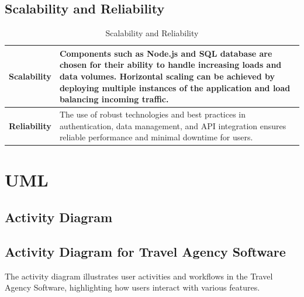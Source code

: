 \documentclass{scrreprt}
\begin{document}
    
    \begin{table}[ht]
    \section{Scalability and Reliability}
    \centering
    \caption{Scalability and Reliability}
    \begin{tabular}{|p{4cm}|p{10cm}|}
    \hline
    \textbf{Scalability} & Components such as Node.js and SQL database are chosen for their ability to handle increasing loads and data volumes. Horizontal scaling can be achieved by deploying multiple instances of the application and load balancing incoming traffic. \\
    \hline
    \textbf{Reliability} & The use of robust technologies and best practices in authentication, data management, and API integration ensures reliable performance and minimal downtime for users. \\
    \hline
    \end{tabular}
    \end{table}

\chapter{UML}
\section{Activity Diagram}

\section*{Activity Diagram for Travel Agency Software}

The activity diagram illustrates user activities and workflows in the Travel Agency Software, highlighting how users interact with various features.
\end{document}
